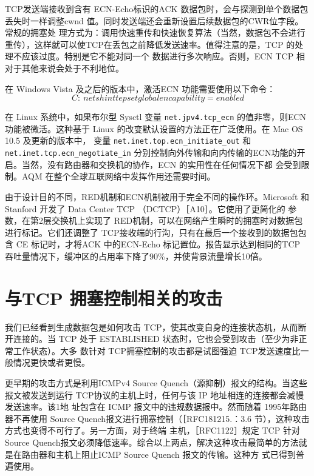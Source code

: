 TCP发送端接收到含有 ECN-Echo标识的ACK 数据包时，会与探测到单个数据包丢失时一样调整cwnd 值。同时发送端还会重新设置后续数据包的CWR位字段。常规的拥塞处
理方式为：调用快速重传和快速恢复算法（当然，数据包不会进行重传），这样就可以使TCP在丢包之前降低发送速率。值得注意的是，TCP 的处理不应该过度。特别是它不能对同一个
数据进行多次响应。否则，ECN TCP 相对于其他来说会处于不利地位。

在 Windows Vista 及之后的版本中，激活ECN 功能需要使用以下命令：
\begin{equation}
    C: \> netsh int tep set global encapability=enabled
\end{equation}

在 Linux 系统中，如果布尔型 Sysctl 变量 \verb|net.jpv4.tcp_ecn| 的值非零，则ECN 功能被微活。这种基于 Linux 的改变默认设置的方法正在广泛使用。在 Mac OS 10.5 及更新的版本中，
变量 \verb|net.inet.top.ecn_initiate_out| 和 \verb|net.inet.tcp.ecn_negotiate_in| 分别控制向外传输和向内传输的ECN功能的开启。当然，没有路由器和交换机的协作，ECN 的实用性在任何情况下都
会受到限制。AQM 在整个全球互联网络中发挥作用还需要时间。

\begin{tcolorbox}
    由于设计目的不同，RED机制和ECN机制被用于完全不同的操作环。Microsoft 和 Stanford 开发了 Data Center TCP （DCTCP）［A10］。它使用了更简化的
    参数，在第2层交换机上实现了 RED机制，可以在网络产生瞬时的拥塞时对数据包进行标记。它们还调整了 TCP接收端的行沟，只有在最后一个接收到的数据包包含
    CE 标记时，才将ACK 中的ECN-Echo 标记置位。报告显示达到相同的TCP 吞吐量情况下，缓冲区的占用率下降了90\%，并使背景流量增长10倍。
\end{tcolorbox}

\section{与TCP 拥塞控制相关的攻击}
我们已经看到生成数据包是如何攻击 TCP，使其改变自身的连接状态机，从而断开连接的。当 TCP 处于 ESTABLISHED 状态时，它也会受到攻击（至少为非正常工作状态）。大多
数针对 TCP拥塞控制的攻击都是试图强迫 TCP发送速度比一般情况更快或者更慢。

更早期的攻击方式是利用ICMPv4 Source Quench（源抑制）报文的结构。当这些报文被发送到运行 TCP协议的主机上时，任何与该 IP 地址相连的连接都会减慢发送速率。该1地
址包含在 ICMP 报文中的违规数据报中。然而随着 1995年路由器不再使用 Source Quench报文进行拥塞控制（［RFC181215.：3.6 节），这种攻击方式也变得不可行了。另一方面，对于终端
主机，［RFC1122］规定 TCP 针对 Source Quench报文必须降低速率。综合以上两点，解决这种攻击最简单的方法就是在路由器和主机上阻止ICMP Source Quench 报文的传输。这种方
式已得到普遍使用。

